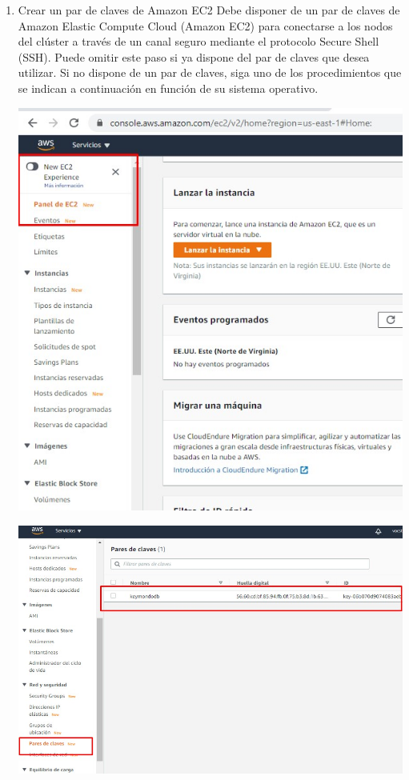\documentclass[12pt,letterpaper]{article}
\begin{document}
\begin{enumerate}
\begin{center}
\end{center}
		\item  Crear un par de claves de Amazon EC2
		Debe disponer de un par de claves de Amazon Elastic Compute Cloud (Amazon EC2) para conectarse a
		los nodos del clúster a través de un canal seguro mediante el protocolo Secure Shell (SSH). Puede omitir
		este paso si ya dispone del par de claves que desea utilizar. Si no dispone de un par de claves, siga uno
		de los procedimientos que se indican a continuación en función de su sistema operativo. 
			\begin{center}
			\includegraphics[width=14cm]{./img/1.3.1.jpg} 
		\end{center}
		\begin{center}
			\includegraphics[width=14cm]{./img/1.3.2.jpg} 
		\end{center}
		

\end{enumerate}
\end{document}
